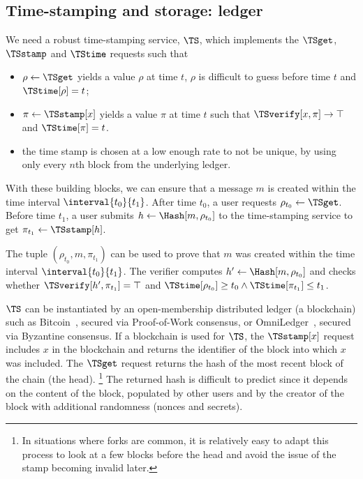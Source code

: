 \subsection{Time-stamping and storage: ledger}%
\label{StorageProperties}\label{timestamp}\label{ledger}

We need a robust time-stamping service, \(\TS\), which implements the \(\TSget\), \(\TSstamp\) and \(\TStime\) requests such that
\begin{itemize}
  \item \(\rho \gets \TSget\) yields a value \(\rho\) at time \(t\), \(\rho\) is difficult to guess before time \(t\) and \(\TStime[\rho] = t\);
  \item \(\pi\gets \TSstamp[x]\) yields a value \(\pi\) at time \(t\) such that \(\TSverify[x, \pi]\to \top\) and \(\TStime[\pi] = t\).
\item the time stamp is chosen at a low enough rate to not be unique, \eg by using only every \(n\)th block from the underlying ledger.
\end{itemize}

With these building blocks, we can ensure that a message \(m\) is created within the time interval \(\interval{t_0}{t_1}\).
After time \(t_0\), a user requests \(\rho_{t_0}\gets \TSget\).
Before time \(t_1\), a user submits \(h\gets \Hash[m, \rho_{t_0}]\) to the time-stamping service to get \(\pi_{t_1}\gets \TSstamp[h]\).

The tuple \((\rho_{t_0}, m, \pi_{t_1})\) can be used to prove that \(m\) was created within the time interval \(\interval{t_0}{t_1}\).
The verifier computes \(h'\gets \Hash[m, \rho_{t_0}]\) and checks whether 
\(\TSverify[h', \pi_{t_1}] = \top\) and \(\TStime[\rho_{t_0}] \geq t_0\land 
  \TStime[\pi_{t_1}] \leq t_1\).

\(\TS\) can be instantiated by an open-membership distributed ledger (\eg a blockchain) such as Bitcoin~\cite{Bitcoin}, secured via Proof-of-Work consensus, or OmniLedger~\cite{OmniLedger}, secured via Byzantine consensus.
If a blockchain is used for \(\TS\), the \(\TSstamp[x]\) request includes \(x\) in the blockchain and returns the identifier of the block into which \(x\) was included.
The \(\TSget\) request returns the hash of the most recent block of the chain 
(\ie the head).%
\footnote{In situations where forks are common, it is relatively easy to adapt this process to look at a few blocks before the head and avoid the issue of the stamp becoming invalid later.}
The returned hash is difficult to predict since it depends on the content of the block, populated by other users and by the creator of the block with additional randomness (\eg nonces and secrets).

